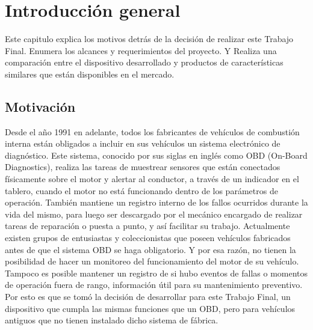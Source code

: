 \chapter{Introducción general} %

Este capitulo explica los motivos detrás de la decisión de realizar este Trabajo Final. 
Enumera los alcances y requerimientos del proyecto. Y Realiza una comparación entre el dispositivo desarrollado y productos de características similares que están disponibles en el mercado.

\label{Chapter1} %
\label{IntroGeneral}


\newcommand{\keyword}[1]{\textbf{#1}}
\newcommand{\tabhead}[1]{\textbf{#1}}
\newcommand{\code}[1]{\texttt{#1}}
\newcommand{\file}[1]{\texttt{\bfseries#1}}
\newcommand{\option}[1]{\texttt{\itshape#1}}
\newcommand{\grados}{$^{\circ}$}



\section{Motivación}

Desde el año 1991 en adelante, todos los fabricantes de vehículos de combustión interna están obligados a incluir en sus vehículos un sistema electrónico de diagnóstico. Este sistema, conocido por sus siglas en inglés como OBD (On-Board Diagnostics), realiza las tareas de muestrear sensores que están conectados físicamente sobre el motor y alertar al conductor, a través de un indicador en el tablero, cuando el motor no está funcionando dentro de los parámetros de operación. También mantiene un registro interno de los fallos ocurridos durante la vida del mismo, para luego ser descargado por el mecánico encargado de realizar tareas de reparación o puesta a punto, y así facilitar su trabajo.
Actualmente existen grupos de entusiastas y coleccionistas que poseen vehículos fabricados antes de que el sistema OBD se haga obligatorio. Y por esa razón, no tienen la posibilidad de hacer un monitoreo del funcionamiento del motor de su vehículo. Tampoco es posible mantener un registro de si hubo eventos de fallas o momentos de operación fuera de rango, información útil para su mantenimiento preventivo.
Por esto es que se tomó la decisión de desarrollar para este Trabajo Final, un dispositivo que cumpla las mismas funciones que un OBD, pero para vehículos antiguos que no tienen instalado dicho sistema de fábrica.

